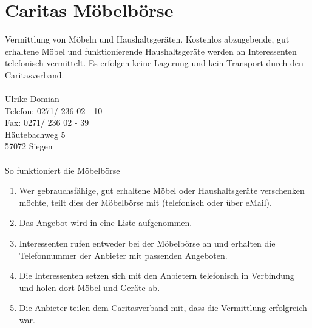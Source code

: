 \section{Caritas Möbelbörse}
Vermittlung von Möbeln und Haushaltsgeräten. Kostenlos abzugebende, gut erhaltene Möbel und funktionierende Haushaltsgeräte werden an Interessenten telefonisch vermittelt. Es erfolgen keine Lagerung und kein Transport durch den Caritasverband.\\
\\
Ulrike Domian \\
Telefon: 0271/ 236 02 - 10\\
Fax: 0271/ 236 02 - 39 \\
Häutebachweg 5\\
57072 Siegen \\
\\
So funktioniert die Möbelbörse\\
\begin{enumerate}
	\item Wer gebrauchsfähige, gut erhaltene Möbel oder Haushaltsgeräte verschenken möchte, teilt dies der Möbelbörse mit (telefonisch oder über eMail).  
	\item Das Angebot wird in eine Liste aufgenommen.
	\item Interessenten rufen entweder bei der Möbelbörse an und erhalten die Telefonnummer der Anbieter mit passenden Angeboten.  
	\item Die Interessenten setzen sich mit den Anbietern telefonisch in Verbindung und holen dort Möbel und Geräte ab.  
	\item Die Anbieter teilen dem Caritasverband mit, dass die Vermittlung erfolgreich war.
\end{enumerate}  